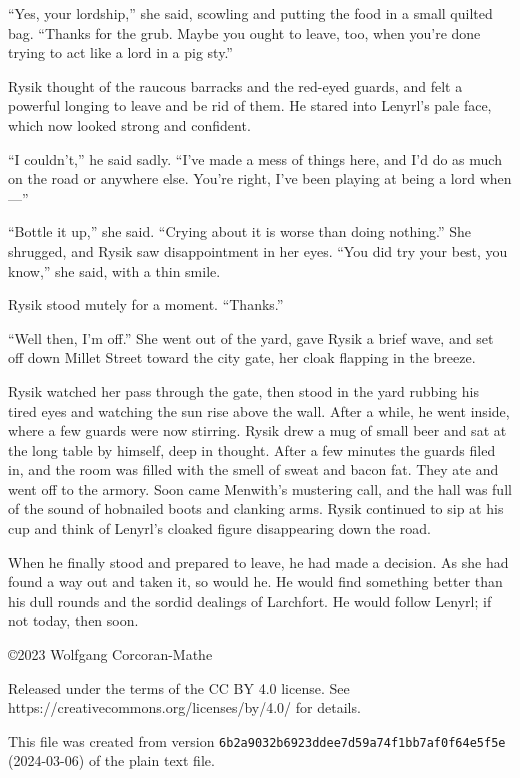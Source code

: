 \documentclass[10pt,a4paper]{article}
\begin{document}
``Yes, your lordship,'' she said, scowling and putting the food in a
small quilted bag. ``Thanks for the grub. Maybe you ought to leave,
too, when you're done trying to act like a lord in a pig sty.''

Rysik thought of the raucous barracks and the red-eyed guards,
and felt a powerful longing to leave and be rid of them. He stared
into Lenyrl's pale face, which now looked strong and confident.

``I couldn't,'' he said sadly. ``I've made a mess of things here,
and I'd do as much on the road or anywhere else. You're right,
I've been playing at being a lord when---''

``Bottle it up,'' she said. ``Crying about it is worse than doing
nothing.'' She shrugged, and Rysik saw disappointment in her
eyes. ``You did try your best, you know,'' she said, with a thin smile.

Rysik stood mutely for a moment. ``Thanks.''

``Well then, I'm off.'' She went out of the yard, gave Rysik a
brief wave, and set off down Millet Street toward the city gate,
her cloak flapping in the breeze.

Rysik watched her pass through the gate, then stood in the
yard rubbing his tired eyes and watching the sun rise above the
wall. After a while, he went inside, where a few guards were now
stirring. Rysik drew a mug of small beer and sat at the long table by
himself, deep in thought. After a few minutes the guards filed in,
and the room was filled with the smell of sweat and bacon fat. They
ate and went off to the armory. Soon came Menwith's mustering call,
and the hall was full of the sound of hobnailed boots and clanking
arms. Rysik continued to sip at his cup and think of Lenyrl's
cloaked figure disappearing down the road.

When he finally stood and prepared to leave, he had made a
decision. As she had found a way out and taken it, so would he. He
would find something better than his dull rounds and the sordid
dealings of Larchfort. He would follow Lenyrl; if not today,
then soon.

\vfill
\begin{flushleft}
\setlength{\parskip}{\baselineskip}
\copyright 2023 Wolfgang Corcoran-Mathe

Released under the terms of the CC BY 4.0 license. See
https://creativecommons.org/licenses/by/4.0/ for details.

This file was created from version
\texttt{6b2a9032b6923ddee7d59a74f1bb7af0f64e5f5e} (2024-03-06) of
the plain text file.
\end{flushleft}
\end{document}
